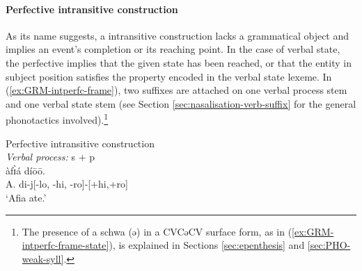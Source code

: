 \begin{exe}
\begin{exe}
\begin{exe}
\begin{exe}
\begin{exe}
\begin{exe}
\begin{exe}
\begin{exe}
\begin{exe}
\begin{exe}
\begin{exe}
 
%  
% 
% 
% 
% 
% 

\paragraph{Perfective intransitive construction}
\label{sec:GRM-verb-perf-intran}

As its name suggests, a   
intransitive construction  lacks a 
grammatical
object and implies an event's completion or its 
reaching point.  In the case of verbal state,
the  perfective  implies that the given state has been reached, 
or 
that the entity in subject position   satisfies the property encoded in
the verbal state lexeme. In 
(\ref{ex:GRM-intperfc-frame}),  two suffixes 
are
attached on  one verbal process stem and one  verbal state 
stem (see Section \ref{sec:nasalisation-verb-suffix}
for the general phonotactics involved).\footnote{The presence of  a schwa
({\sls ə}) in a CVCəCV surface form, as in (\ref{ex:GRM-intperfc-frame-state}), 
is explained in Sections \ref{sec:epenthesis} and \ref{sec:PHO-weak-syll}.}


\ea\label{ex:GRM-intperfc-frame}{\rm Perfective intransitive construction}\\


\ea\label{ex:GRM-intperfc-frame-process}{{\it  Verbal process:} {\sc s}  $+$
{\sc p} }\\
\gll àfɪ̀á díōō.\\
A. {di-j[{\sc -lo, -hi, -ro}]-[{\sc +hi,+ro}]}\\
\glt `Afia ate.'


\end{exe}
\end{exe}
\end{exe}
\end{exe}
\end{exe}
\end{exe}
\end{exe}
\end{exe}
\end{exe}
\end{exe}
\end{exe}
